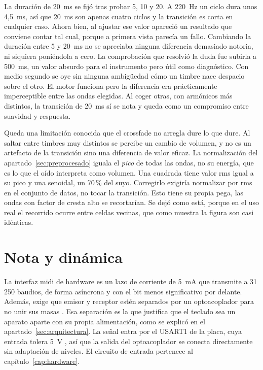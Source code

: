 La duración de 20~ms se fijó tras probar 5, 10 y 20. A 220~Hz un ciclo dura unos
4,5~ms, así que 20~ms son apenas cuatro ciclos y la transición es corta en
cualquier caso. Ahora bien, al ajustar ese valor apareció un resultado que
conviene contar tal cual, porque a primera vista parecía un fallo. Cambiando la
duración entre 5 y 20~ms no se apreciaba ninguna diferencia demasiado notoria, ni siquiera
poniéndola a cero. La comprobación que resolvió la duda fue subirla a 500~ms,
un valor absurdo para el instrumento pero útil como diagnóstico. Con medio
segundo se oye sin ninguna ambigüedad cómo un timbre nace despacio sobre el
otro. El motor funciona pero la diferencia era prácticamente imperceptible entre
las ondas elegidas. Al coger otras, con armónicos más distintos, la transición de 20~ms sí se nota y
queda como un compromiso entre suavidad y respuesta.

Queda una limitación conocida que el crossfade no arregla dure lo que dure. Al
saltar entre timbres muy distintos se percibe un cambio de volumen, y no es un
artefacto de la transición sino una diferencia de valor eficaz. La normalización
del apartado~\ref{sec:preprocesado} iguala el \emph{pico} de todas las ondas,
no su energía, que es lo que el oído interpreta como volumen. Una cuadrada tiene
valor \gls{rms} igual a su pico y una senoidal, un 70\,\% del suyo.
Corregirlo exigiría normalizar por \gls{rms} en el conjunto de datos, no tocar
la transición. Esto tiene su propia pega, las ondas con factor de cresta
alto se recortarían. Se dejó como está, porque en el uso real el recorrido
ocurre entre celdas vecinas, que como muestra la figura son casi idénticas.

\section{Nota y dinámica}
\label{sec:midi}

La interfaz \gls{midi} de hardware es un lazo de corriente de 5~mA que
transmite a 31\,250 baudios, de forma asíncrona y con el bit menos significativo
por delante. Además, exige que emisor y receptor estén separados por un optoacoplador
para no unir sus masas \cite{MIDI1}. Esa separación es la que justifica que el
teclado sea un aparato aparte con su propia alimentación, como se explicó en el
apartado~\ref{sec:arquitectura}. La señal entra por el USART1 de la placa, cuya
entrada tolera 5~V \cite{DaisySeed}, así que la salida del optoacoplador se
conecta directamente sin adaptación de niveles. El circuito de entrada
pertenece al capítulo~\ref{cap:hardware}.

